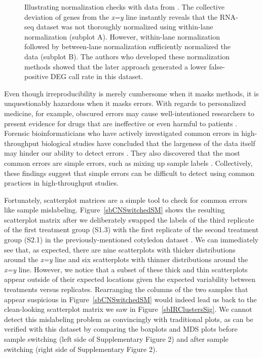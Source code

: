 \documentclass{bioinfo}
\begin{document}
\begin{figure}
\caption{Illustrating normalization checks with data from \cite{Risso}. The collective deviation of genes from the \textit{x=y} line instantly reveals that the RNA-seq dataset was not thoroughly normalized using within-lane normalization (subplot A). However, within-lane normalization followed by between-lane normalization sufficiently normalized the data (subplot B). The authors who developed these normalization methods showed that the later approach generated a lower false-positive DEG call rate in this dataset.
\label{yeastWithinBetween}}
\end{figure}

Even though irreproducibility is merely cumbersome when it masks methods, it is unquestionably hazardous when it masks errors. With regards to personalized medicine, for example, obscured errors may cause well-intentioned researchers to present evidence for drugs that are ineffective or even harmful to patients \citep{Baggerly}. Forensic bioinformaticians who have actively investigated common errors in high-throughput biological studies have concluded that the largeness of the data itself may hinder our ability to detect errors \citep{Baggerly}. They also discovered that the most common errors are simple errors, such as mixing up sample labels \citep{Baggerly}. Collectively, these findings suggest that simple errors can be difficult to detect using common practices in high-throughput studies.

Fortunately, scatterplot matrices are a simple tool to check for common errors like sample mislabeling. Figure~\ref{sbCNSwitchedSM} shows the resulting scatterplot matrix after we deliberately swapped the labels of the third replicate of the first treatment group (S1.3) with the first replicate of the second treatment group (S2.1) in the previously-mentioned cotyledon dataset \citep{Brown}. We can immediately see that, as expected, there are nine scatterplots with thicker distributions around the \textit{x=y} line and six scatterplots with thinner distributions around the \textit{x=y} line. However, we notice that a subset of these thick and thin scatterplots appear outside of their expected locations given the expected variability between treatments versus replicates. Rearranging the columns of the two samples that appear suspicious in Figure~\ref{sbCNSwitchedSM} would indeed lead us back to the clean-looking scatterplot matrix we saw in Figure~\ref{sbIRClustersSig}. We cannot detect this mislabeling problem as convincingly with traditional plots, as can be verified with this dataset by comparing the boxplots and MDS plots before sample switching (left side of Supplementary Figure 2) and after sample switching (right side of Supplementary Figure 2).
\end{document}
